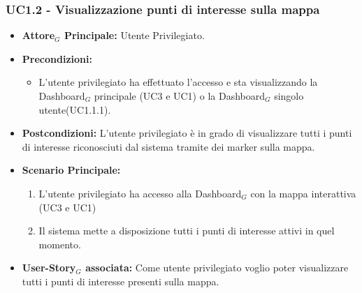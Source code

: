 \documentclass[11pt]{article}
\begin{document}
\begin{justify}
\subsubsection{\textbf{UC1.2 - Visualizzazione punti di interesse sulla mappa}}
\label{UC1.2}
\begin{itemize}
     \item \textbf{Attore$_G$ Principale:} Utente Privilegiato.
     \item \textbf{Precondizioni:}
        \begin{itemize}
    		\item L'utente privilegiato ha effettuato l'accesso e sta visualizzando la Dashboard$_G$ principale (UC3 e UC1) o la Dashboard$_G$ singolo utente(UC1.1.1).
        \end{itemize}
     \item \textbf{Postcondizioni:} L'utente privilegiato è in grado di visualizzare tutti i punti di interesse riconosciuti dal sistema tramite dei marker sulla mappa.
     \item \textbf{Scenario Principale:}
        \begin{enumerate}
            \item L'utente privilegiato ha accesso alla Dashboard$_G$ con la mappa interattiva (UC3 e UC1)
            \item Il sistema mette a disposizione tutti i punti di interesse attivi in quel momento.
        \end{enumerate}
     \item \textbf{User-Story$_G$ associata:}
     Come utente privilegiato voglio poter visualizzare tutti i punti di interesse presenti sulla mappa.
\end{itemize}

\end{justify}
\end{document}
